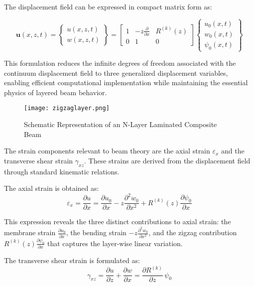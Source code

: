 \documentclass[12pt,a4paper]{report}
\begin{document}
The displacement field can be expressed in compact matrix form as:

\begin{equation}
\mathbf{u}(x,z,t) = 
\begin{Bmatrix}
u(x,z,t) \\
w(x,z,t)
\end{Bmatrix}
=
\begin{bmatrix}
1 & -z\frac{\partial }{\partial x} & R^{(k)}(z) \\
0 & 1 & 0
\end{bmatrix}
\begin{Bmatrix}
u_0(x,t) \\
w_0(x,t) \\
\psi_0(x,t)
\end{Bmatrix}
\end{equation}


This formulation reduces the infinite degrees of freedom associated with the continuum displacement field to three generalized displacement variables, enabling efficient computational implementation while maintaining the essential physics of layered beam behavior.

\begin{figure}[htbp]
\centering
\texttt{[image: zigzaglayer.png]}
\caption{Schematic Representation of an
N-Layer Laminated Composite Beam}
\label{fig:zigzag_layer}
\end{figure}

The strain components relevant to beam theory are the axial strain $\varepsilon_x$ and the transverse shear strain $\gamma_{xz}$. These strains are derived from the displacement field through standard kinematic relations.

The axial strain is obtained as:
\begin{equation}
\varepsilon_x = \frac{\partial u}{\partial x} 
= \frac{\partial u_0}{\partial x} 
- z \frac{\partial^2 w_0}{\partial x^2} 
+ R^{(k)}(z) \frac{\partial \psi_0}{\partial x}
\end{equation}

This expression reveals the three distinct contributions to axial strain: the membrane strain 
$\frac{\partial u_0}{\partial x}$, the bending strain 
$- z \frac{\partial^2 w_0}{\partial x^2}$, and the zigzag contribution 
$R^{(k)}(z) \frac{\partial \psi_0}{\partial x}$ that captures the layer-wise linear variation.

The transverse shear strain is formulated as:
\begin{equation}
\gamma_{xz} = \frac{\partial u}{\partial z} + \frac{\partial w}{\partial x} 
= \frac{\partial R^{(k)}}{\partial z} \, \psi_0 
\end{equation}
\end{document}
